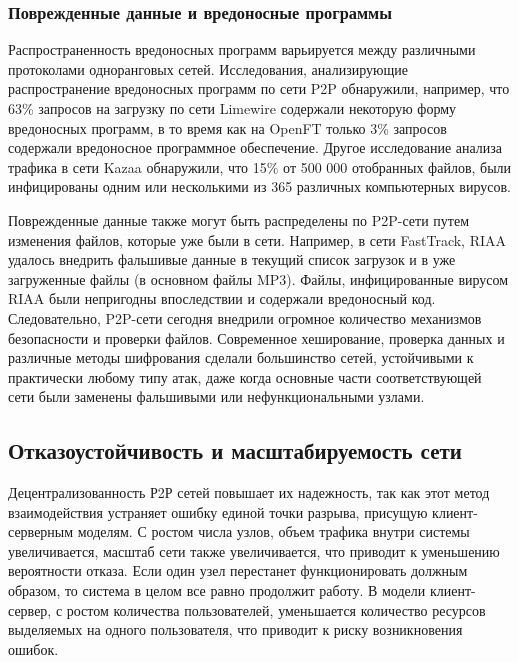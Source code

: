 \documentclass[bachelor, och, coursework]{SCWorks}
\begin{document}
\subsubsection{Поврежденные данные и вредоносные программы}
Распространенность вредоносных программ варьируется между различными протоколами одноранговых сетей. 
Исследования, анализирующие распространение вредоносных программ по сети P2P обнаружили, например, что 63\% запросов на загрузку 
по сети Limewire содержали некоторую форму вредоносных программ, в то время как на OpenFT только 3\% запросов содержали 
вредоносное программное обеспечение. Другое исследование анализа трафика в сети Kazaa обнаружили, что 15\% от 500 000 отобранных файлов, 
были инфицированы одним или несколькими из 365 различных компьютерных вирусов.

Поврежденные данные также могут быть распределены по P2P-сети путем изменения файлов, которые уже были в сети. 
Например, в сети FastTrack, RIAA удалось внедрить фальшивые данные в текущий список загрузок и в уже загруженные файлы (в основном файлы MP3). 
Файлы, инфицированные вирусом RIAA были непригодны впоследствии и содержали вредоносный код. 
Следовательно, P2P-сети сегодня внедрили огромное количество механизмов безопасности и проверки файлов. 
Современное хеширование, проверка данных и различные методы шифрования сделали большинство сетей, устойчивыми к 
практически любому типу атак, даже когда основные части соответствующей сети были заменены фальшивыми или нефункциональными узлами.

\subsection{Отказоустойчивость и масштабируемость сети}
Децентрализованность Р2Р сетей повышает их надежность, так как этот метод взаимодействия устраняет ошибку единой точки разрыва, 
присущую клиент-серверным моделям. С ростом числа узлов, объем трафика внутри системы увеличивается, масштаб сети также увеличивается, 
что приводит к уменьшению вероятности отказа. Если один узел перестанет функционировать должным образом, 
то система в целом все равно продолжит работу. 
В модели клиент-сервер, с ростом количества пользователей, уменьшается количество ресурсов выделяемых на одного пользователя, 
что приводит к риску возникновения ошибок.
\end{document}
